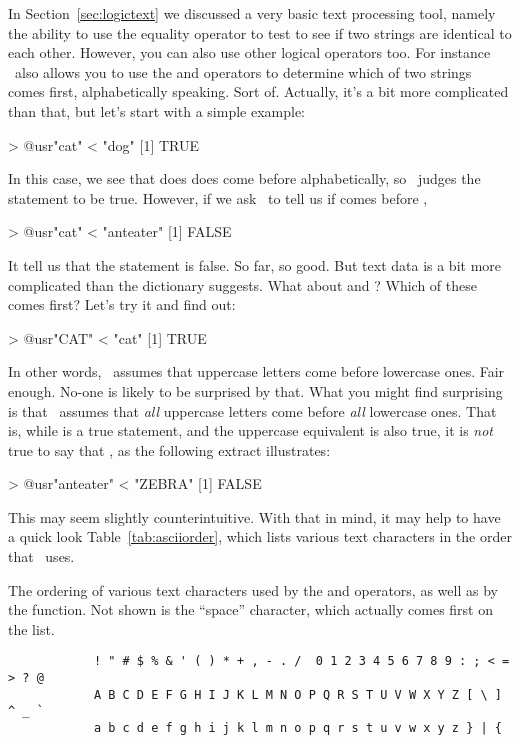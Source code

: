 
In Section~\ref{sec:logictext} we discussed a very basic text processing tool, namely the ability to use the equality operator \rtext{==} to test to see if two strings are identical to each other. However, you can also use other logical operators too. For instance \R\ also allows you to use the \rtext{<} and \rtext{>} operators to determine which of two strings comes first, alphabetically speaking. Sort of. Actually, it's a bit more complicated than that, but let's start with a simple example:
\begin{rblock1}
> @usr{"cat" < "dog"}
[1] TRUE
\end{rblock1}
In this case, we see that  does does come before  alphabetically, so \R\ judges the statement to be true. However, if we ask \R\ to tell us if  comes before , 
\begin{rblock1}
> @usr{"cat" < "anteater"}
[1] FALSE
\end{rblock1} 
It tell us that the statement is false. So far, so good. But text data is a bit more complicated than the dictionary suggests. What about  and ? Which of these comes first? Let's try it and find out:
\begin{rblock1}
> @usr{"CAT" < "cat"}
[1] TRUE
\end{rblock1}
In other words, \R\ assumes that uppercase letters come before lowercase ones. Fair enough. No-one is likely to be surprised by that. What you might find surprising is that \R\ assumes that {\it all} uppercase letters come before {\it all} lowercase ones. That is, while  is a true statement, and the uppercase equivalent  is also true, it is {\it not} true to say that , as the following extract illustrates:
\begin{rblock1}
> @usr{"anteater" < "ZEBRA"}
[1] FALSE
\end{rblock1}
This may seem slightly counterintuitive. With that in mind, it may help to have a quick look Table~\ref{tab:asciiorder}, which lists various text characters in the order that \R\ uses. 

\begin{table}
\begin{center}
\caption{The ordering of various text characters used by the \rtext{<} and \rtext{>} operators, as well as by the  function. Not shown is the ``space'' character, which actually comes first on the list.}\tabcapsep
\label{tab:asciiorder}
\begin{verbatim}
            ! " # $ % & ' ( ) * + , - . /  0 1 2 3 4 5 6 7 8 9 : ; < = > ? @ 
            A B C D E F G H I J K L M N O P Q R S T U V W X Y Z [ \ ]  ^ _ ` 
            a b c d e f g h i j k l m n o p q r s t u v w x y z } | {
\end{verbatim}
\HR
\end{center}
\end{table}






